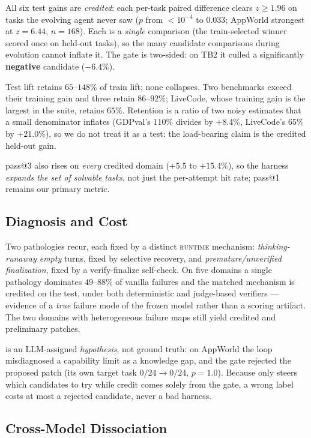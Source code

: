 All six test gains are \emph{credited}: each per-task paired difference clears
$z\!\ge\!1.96$ on tasks the evolving agent never saw ($p$ from $<10^{-4}$ to $0.033$;
AppWorld strongest at $z{=}6.44$, $n{=}168$). Each is a \emph{single} comparison (the
train-selected winner scored once on held-out tasks), so the many candidate comparisons
during evolution cannot inflate it. The gate is two-sided: on TB2 it culled a significantly
\textbf{negative} candidate ($-6.4$\%).

Test lift retains $65$--$148\%$ of train lift; none collapses. Two benchmarks exceed their
training gain and three retain $86$--$92\%$; LiveCode, whose training gain is the largest in
the suite, retains $65\%$. Retention is a ratio of two
noisy estimates that a small denominator inflates (GDPval's $110\%$ divides by $+8.4$\%,
LiveCode's $65\%$ by $+21.0$\%), so we do not treat it as a test: the load-bearing claim is
the credited held-out gain.

pass@3 also rises on \emph{every} credited domain ($+5.5$ to $+15.4$\%), so the harness
\emph{expands the set of solvable tasks}, not just the per-attempt hit rate; pass@1 remains
our primary metric.

\subsection{Diagnosis and Cost}

Two pathologies recur, each fixed by a distinct \textsc{runtime} mechanism:
\emph{thinking-runaway empty} turns, fixed by selective recovery, and
\emph{premature/unverified finalization}, fixed by a verify-finalize self-check. On five
domains a single pathology dominates $49$--$88\%$ of vanilla failures and the matched
mechanism is credited on the test, under both deterministic and judge-based verifiers ---
evidence of a \emph{true} failure mode of the frozen model rather than a scoring artifact.
The two domains with heterogeneous failure maps still yield credited and preliminary
patches.



\why{} is an LLM-assigned \emph{hypothesis}, not ground truth: on AppWorld the loop
misdiagnosed a capability limit as a knowledge gap, and the gate rejected the proposed patch
(its own target task $0/24 \to 0/24$, $p{=}1.0$). Because \why{} only steers which candidates
to try while credit comes solely from the gate, a wrong label costs at most a rejected
candidate, never a bad harness.

\subsection{Cross-Model Dissociation}

